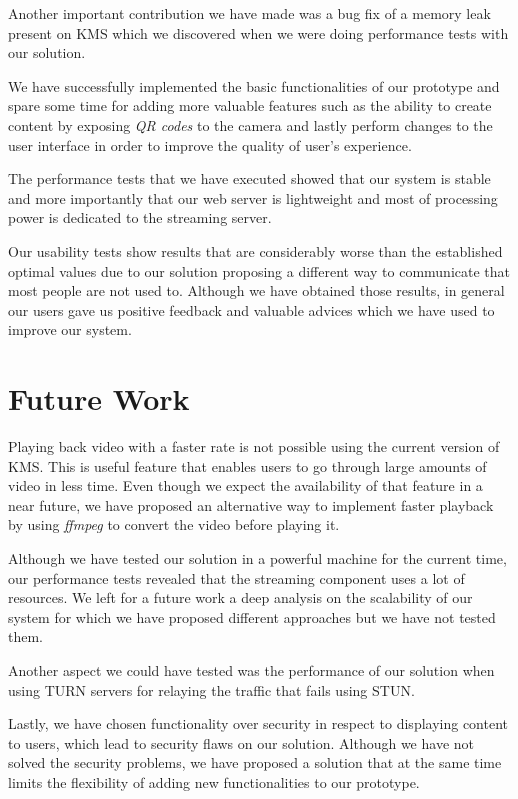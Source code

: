 Another important contribution we have made was a bug fix of a memory leak present on \ac{KMS} which we discovered when we were doing performance tests with our solution.

	We have successfully implemented the basic functionalities of our prototype and spare some time for adding more valuable features such as the ability to create content by exposing \emph{QR codes} to the camera and lastly perform changes to the user interface in order to improve the quality of user's experience.
        
	The performance tests that we have executed showed that our system is stable and more importantly that our web server is lightweight and most of processing power is dedicated to the streaming server.

	Our usability tests show results that are considerably worse than the established optimal values due to our solution proposing a different way to communicate that most people are not used to. Although we have obtained those results, in general our users gave us positive feedback and valuable advices which we have used to improve our system. 

\section{Future Work}
\label{section:future}
	Playing back video with a faster rate is not possible using the current version of \ac{KMS}. This is useful feature that enables users to go through large amounts of video in less time. Even though we expect the availability of that feature in a near future, we have proposed an alternative way to implement faster playback by using \emph{ffmpeg} to convert the video before playing it.

	Although we have tested our solution in a powerful machine for the current time, our performance tests revealed that the streaming component uses a lot of resources. We left for a future work a deep analysis on the scalability of our system for which we have proposed different approaches but we have not tested them.

	Another aspect we could have tested was the performance of our solution when using \ac{TURN} servers for relaying the traffic that fails using \ac{STUN}.

	Lastly, we have chosen functionality over security in respect to displaying content to users, which lead to security flaws on our solution. Although we have not solved the security problems, we have proposed a solution that at the same time limits the flexibility of adding new functionalities to our prototype.
\cleardoublepage
